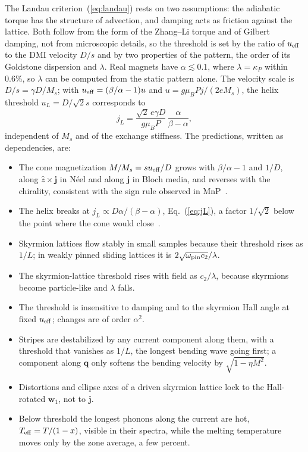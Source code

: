 \documentclass[prb,reprint,amsmath,amssymb,superscriptaddress,floatfix]{revtex4-2}
\newcommand{\ueff}{u_{\rm eff}}
\newcommand{\wone}{\mathbf w_1}
\newcommand{\kP}{\kappa_P}
\begin{document}
The Landau criterion~(\ref{eq:landau}) rests on two assumptions: the adiabatic torque has the structure of advection, and damping acts as friction against the lattice. Both follow from the form of the Zhang--Li torque and of Gilbert damping, not from microscopic details, so the threshold is set by the ratio of $\ueff$ to the DMI velocity $D/s$ and by two properties of the pattern, the order of its Goldstone dispersion and $\lambda$. Real magnets have $\alpha\lesssim0.1$, where $\lambda=\kP$ within 0.6\%, so $\lambda$ can be computed from the static pattern alone. The velocity scale is $D/s=\gamma D/M_s$; with $\ueff=(\beta/\alpha-1)u$ and $u=g\mu_BPj/(2eM_s)$, the helix threshold $u_L=D/\sqrt2s$ corresponds to
\begin{equation}
j_L=\frac{\sqrt2\,e\gamma D}{g\mu_BP}\,\frac{\alpha}{\beta-\alpha},
\label{eq:jL}
\end{equation}
independent of $M_s$ and of the exchange stiffness. The predictions, written as dependencies, are:
\begin{itemize}
\item The cone magnetization $M/M_s=s\ueff/D$ grows with $\beta/\alpha-1$ and $1/D$, along $\hat z\times\mathbf j$ in N\'eel and along $\mathbf j$ in Bloch media, and reverses with the chirality, consistent with the sign rule observed in MnP~\cite{Jiang2020}.
\item The helix breaks at $j_L\propto D\alpha/(\beta-\alpha)$, Eq.~(\ref{eq:jL}), a factor $1/\sqrt2$ below the point where the cone would close~\cite{Masell2020}.
\item Skyrmion lattices flow stably in small samples because their threshold rises as $1/L$; in weakly pinned sliding lattices it is $2\sqrt{\omega_{\rm pin}c_2}/\lambda$.
\item The skyrmion-lattice threshold rises with field as $c_2/\lambda$, because skyrmions become particle-like and $\lambda$ falls.
\item The threshold is insensitive to damping and to the skyrmion Hall angle at fixed $\ueff$; changes are of order $\alpha^2$.
\item Stripes are destabilized by any current component along them, with a threshold that vanishes as $1/L$, the longest bending wave going first; a component along $\mathbf q$ only softens the bending velocity by $\sqrt{1-\eta M^2}$.
\item Distortions and ellipse axes of a driven skyrmion lattice lock to the Hall-rotated $\wone$, not to $\mathbf j$.
\item Below threshold the longest phonons along the current are hot, $T_{\rm eff}=T/(1-x)$, visible in their spectra, while the melting temperature moves only by the zone average, a few percent.
\end{itemize}
\end{document}
